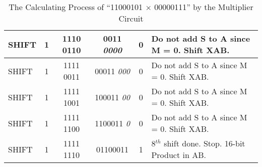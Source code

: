 \begin{table}[h]
{\begin{tabular}{|l|c|c|c|c|l|}
    SHIFT                                                               & 1 & 1110 0110 & 0011 \textit{0000}        & 0 & Do not add S to A   since M = 0. Shift XAB.                                                                            \\ \hline
    SHIFT                                                               & 1 & 1111 0011 & 00011 \textit{000}        & 0 & Do not add S to A   since M = 0. Shift XAB.                                                                            \\ \hline
    SHIFT                                                               & 1 & 1111 1001 & 100011 \textit{00}        & 0 & Do not add S to A   since M = 0. Shift XAB.                                                                            \\ \hline
    SHIFT                                                               & 1 & 1111 1100 & 1100011 \textit{0}        & 0 & Do not add S to A   since M = 0. Shift XAB.                                                                            \\ \hline
    SHIFT                                                               & 1 & 1111 1110 & 01100011                  & 1 & 8$^{th}$ shift done. Stop.   16-bit Product in AB.                                                                          \\ \hline
    \end{tabular}}
    \caption{The Calculating Process of ``11000101 $\times$ 00000111'' by the Multiplier Circuit}
    \label{tab:pre-lab}
    \end{table}
    